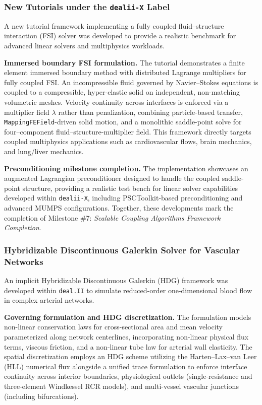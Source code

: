 \documentclass[a4paper,12pt, numbers]{article}
\newcommand{\dealii}{\texttt{deal.II}}
\begin{document}
\subsubsection*{New Tutorials under the \texttt{dealii-X} Label}

\noindent A new tutorial framework implementing a fully coupled fluid--structure interaction (FSI) solver was developed to provide a realistic benchmark for advanced linear solvers and multiphysics workloads.

\noindent\textbf{Immersed boundary FSI formulation.}
The tutorial demonstrates a finite element immersed boundary method with distributed Lagrange multipliers for fully coupled FSI. An incompressible fluid governed by Navier--Stokes equations is coupled to a compressible, hyper-elastic solid on independent, non-matching volumetric meshes. Velocity continuity across interfaces is enforced via a multiplier field $\lambda$ rather than penalization, combining particle-based transfer, \texttt{MappingFEField}-driven solid motion, and a monolithic saddle-point solve for four--component fluid--structure-multiplier field. This framework directly targets coupled multiphysics applications such as cardiovascular flows, brain mechanics, and lung/liver mechanics.

\noindent\textbf{Preconditioning milestone completion.}
The implementation showcases an augmented Lagrangian preconditioner designed to handle the coupled saddle-point structure, providing a realistic test bench for linear solver capabilities developed within \texttt{dealii-X}, including PSCToolkit-based preconditioning and advanced MUMPS configurations. Together, these developments mark the completion of Milestone \#7: \emph{Scalable Coupling Algorithms Framework Completion}.

\subsubsection*{Hybridizable Discontinuous Galerkin Solver for Vascular Networks}

\noindent An implicit Hybridizable Discontinuous Galerkin (HDG) framework was developed within \dealii{} to simulate reduced-order one-dimensional blood flow in complex arterial networks.

\noindent\textbf{Governing formulation and HDG discretization.}
The formulation models non-linear conservation laws for cross-sectional area and mean velocity parameterized along network centerlines, incorporating non-linear physical flux terms, viscous friction, and a non-linear tube law for arterial wall elasticity. The spatial discretization employs an HDG scheme utilizing the Harten--Lax--van Leer (HLL) numerical flux alongside a unified trace formulation to enforce interface continuity across interior boundaries, physiological outlets (single-resistance and three-element Windkessel RCR models), and multi-vessel vascular junctions (including bifurcations).
\end{document}
